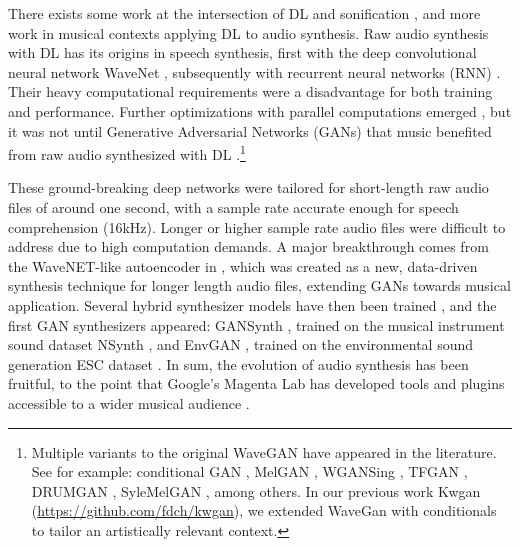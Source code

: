 \documentclass[a4paper,10pt,oneside]{article}
\begin{document}
\begin{sloppy}
There exists some work at the intersection of DL and sonification \cite{Winters2019, pmlr-v123-herrmann20a}, and more work in musical contexts applying DL to audio synthesis. Raw audio synthesis with DL has its origins in speech synthesis, first with the deep convolutional neural network WaveNet \cite{oord2016wavenet}, subsequently with recurrent neural networks (RNN) \cite{mehri2017samplernn, kalchbrenner2018efficient}. Their heavy computational requirements were a disadvantage for both training and performance. Further optimizations with parallel computations emerged \cite{oord2017parallel,lamtharn_hantrakul_2019_3527860,yamamoto2020parallel,song2021improved}, but it was not until Generative Adversarial Networks (GANs) that music benefited from raw audio synthesized with DL \cite{Bollepalli_2017, 2017Kaneko, pascual2017segan, donahue2018adversarial, 2019waveglow, tian2020tfgan, Liu_2020}.\footnote{Multiple variants to the original WaveGAN have appeared in the literature. See for example: conditional GAN \cite{2018Lee}, MelGAN \cite{NEURIPS2019_6804c9bc, jang2021universal}, WGANSing \cite{Chandna_2019}, TFGAN \cite{tian2020tfgan}, DRUMGAN \cite{javier_nistal_2020_4245504}, SyleMelGAN \cite{mustafa2021stylemelgan}, among others. In our previous work Kwgan (\url{https://github.com/fdch/kwgan}), we  extended WaveGan with conditionals to tailor an artistically relevant context.}

These ground-breaking deep networks were tailored for short-length raw audio files of around one second, with a sample rate accurate enough for speech comprehension (16kHz). Longer or higher sample rate audio files were difficult to address due to high computation demands. A major breakthrough comes from the WaveNET-like autoencoder in \cite{engel2017neural}, which was created as a new, data-driven synthesis technique for longer length audio files, extending GANs towards musical application. Several hybrid synthesizer models have then been trained \cite{mccarthy2020hooligan}, and the first GAN synthesizers appeared: GANSynth \cite{engel2019gansynth}, trained on the musical instrument sound dataset NSynth \cite{engel2017neural}, and EnvGAN \cite{madhu2021envgan}, trained on the environmental sound generation ESC dataset \cite{2015piczak}. In sum, the evolution of audio synthesis has been fruitful, to the point that Google's Magenta Lab has developed tools and plugins accessible to a wider musical audience \cite{adam_roberts_2019_4285266}.


\end{sloppy}
\end{document}
